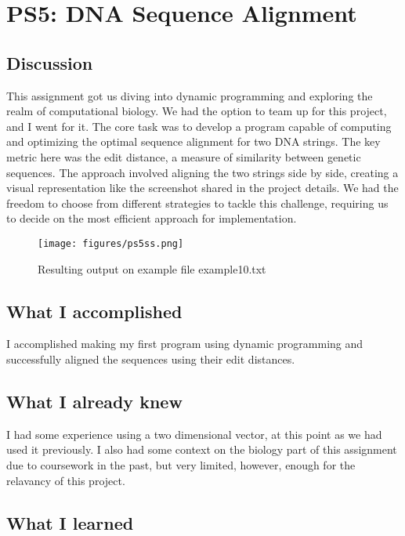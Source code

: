 \section{PS5: DNA Sequence Alignment}\label{sec:ps5}

\subsection{Discussion}\label{sec:ps5:disc}

This assignment got us diving into dynamic programming and exploring the realm of computational biology. We had the option to team up for this project, and I went for it. The core task was to develop a program capable of computing and optimizing the optimal sequence alignment for two DNA strings. The key metric here was the edit distance, a measure of similarity between genetic sequences. The approach involved aligning the two strings side by side, creating a visual representation like the screenshot shared in the project details. We had the freedom to choose from different strategies to tackle this challenge, requiring us to decide on the most efficient approach for implementation.

\begin{figure}[tbh]
	\centering
	\texttt{[image: figures/ps5ss.png]}
	\caption{Resulting output on example file example10.txt}
	\label{fig:ps5ss}
\end{figure}


\subsection{What I accomplished}\label{sec:ps5:accomplish}

I accomplished making my first program using dynamic programming and successfully aligned the sequences using their edit distances.

\subsection{What I already knew}\label{sec:ps5:knew}

I had some experience using a two dimensional vector, at this point as we had used it previously. I also had some context on the biology part of this assignment due to coursework in the past, but very limited, however, enough for the relavancy of this project.

\subsection{What I learned}\label{sec:ps5:learned}

